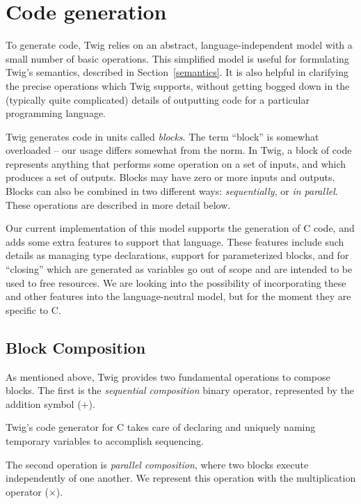 
\section{Code generation}
\label{twig:code-gen}

To generate code, Twig relies on an abstract, language-independent model with a
small number of basic operations. This simplified model is useful for
formulating Twig's semantics, described in Section~\ref{semantics}. It is also
helpful in clarifying the precise operations which Twig supports, without
getting bogged down in the (typically quite complicated) details of outputting
code for a particular programming language.

Twig generates code in units called \emph{blocks}. The term ``block'' is
somewhat overloaded -- our usage differs somewhat from the norm. In Twig, a
block of code represents anything that performs some operation on a set of
inputs, and which produces a set of outputs. Blocks may have zero or more inputs
and outputs. Blocks can also be combined in two different ways:
\emph{sequentially}, or \emph{in parallel}. These operations are described in
more detail below.

Our current implementation of this model supports the generation of C code, and
adds some extra features to support that language. These features include such
details as managing type declarations, support for parameterized blocks, and for
``closing'' which are generated as variables go out of scope and are intended to
be used to free resources. We are looking into the possibility of incorporating
these and other features into the language-neutral model, but for the moment
they are specific to C.

\subsection{Block Composition}

As mentioned above, Twig provides two fundamental operations to compose blocks.
The first is the \emph{sequential composition} binary operator, represented by
the addition symbol ($+$).

Twig's code generator for C takes care of declaring and uniquely naming
temporary variables to accomplish sequencing.

The second operation is \emph{parallel composition}, where two blocks execute
independently of one another. We represent this operation with the
multiplication operator ($\times$).

